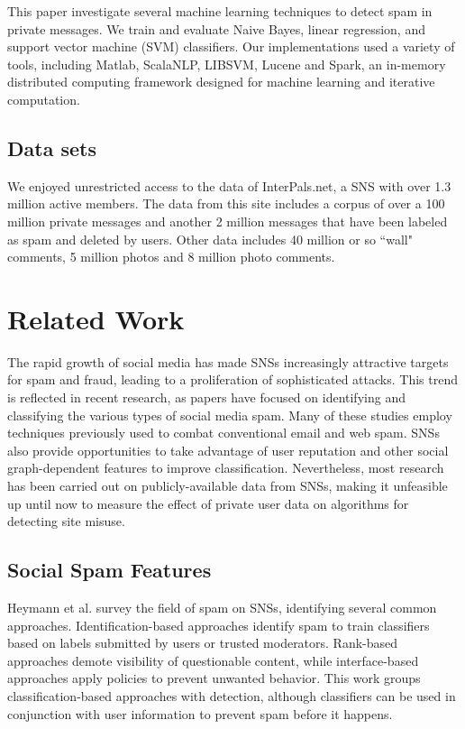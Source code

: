\documentclass[preprint]{acm_proc_article-sp}
\begin{document}
This paper investigate several machine learning techniques to 
detect spam in private messages. We train and evaluate Naive Bayes, 
linear regression, and support vector machine (SVM) 
classifiers. Our implementations used a variety of tools, 
including Matlab, ScalaNLP, LIBSVM, Lucene and Spark, 
an in-memory distributed computing framework designed for machine 
learning and iterative computation.

\subsection{Data sets}

We enjoyed unrestricted access to the data of InterPals.net, a SNS with 
over 1.3 million active members. The data from this site includes a corpus of over a 
100 million private messages and another 2 million messages that have been 
labeled as spam  and deleted by users. Other data includes 40 million or so ``wall" 
comments, 5 million photos and 8 million photo comments. 

\section{Related Work} 

The rapid growth of social media has made SNSs increasingly attractive targets 
for spam and fraud, leading to a proliferation of sophisticated attacks. This 
trend is reflected in recent research, as papers 
have focused on identifying and classifying the various types of social media spam. 
Many of these studies employ techniques previously used to combat conventional 
email and web spam. SNSs also provide opportunities to take advantage of user 
reputation and other social graph-dependent features to improve classification. 
Nevertheless, most research has been carried out on publicly-available data 
from SNSs, making it unfeasible up until now to measure the effect of private user 
data on algorithms for detecting site misuse.

\subsection{Social Spam Features}

Heymann et al. \cite{heymann} survey the field of spam on SNSs, identifying 
several common approaches. Identification-based approaches identify spam to 
train classifiers based on labels submitted by users or trusted moderators. 
Rank-based approaches demote visibility of questionable content, while interface-based 
approaches apply policies to prevent unwanted behavior. This work groups 
classification-based approaches with detection, although classifiers can be 
used in conjunction with user information to prevent spam before it happens.
\end{document}
